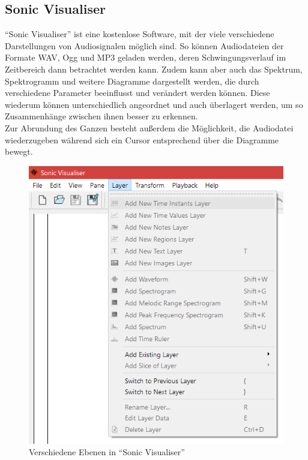 \documentclass[a4paper]{article}
\begin{document}
\subsection{Sonic Visualiser}
"`Sonic Visualiser"' ist eine kostenlose Software, mit der viele verschiedene Darstellungen von Audiosignalen möglich sind.
So können Audiodateien der Formate WAV, Ogg und MP3 geladen werden, deren Schwingungsverlauf im Zeitbereich dann betrachtet werden kann. Zudem kann aber auch das Spektrum, Spektrogramm und weitere Diagramme dargestellt werden, die durch verschiedene Parameter beeinflusst und verändert werden können. Diese wiederum können unterschiedlich angeordnet und auch überlagert werden, um so Zusammenhänge zwischen ihnen besser zu erkennen.\\
Zur Abrundung des Ganzen besteht außerdem die Möglichkeit, die Audiodatei wiederzugeben während sich ein Cursor entsprechend über die Diagramme bewegt.
\vspace{2em}
\begin{figure}[H]
    \centering
    \begin{minipage}{0.42\textwidth}
        \centering
        \includegraphics[width=1.0\textwidth]{Sonic_Layers.png}
        \caption{Verschiedene Ebenen in "`Sonic Visualiser"'}
    \end{minipage}
\end{figure}
\end{document}
